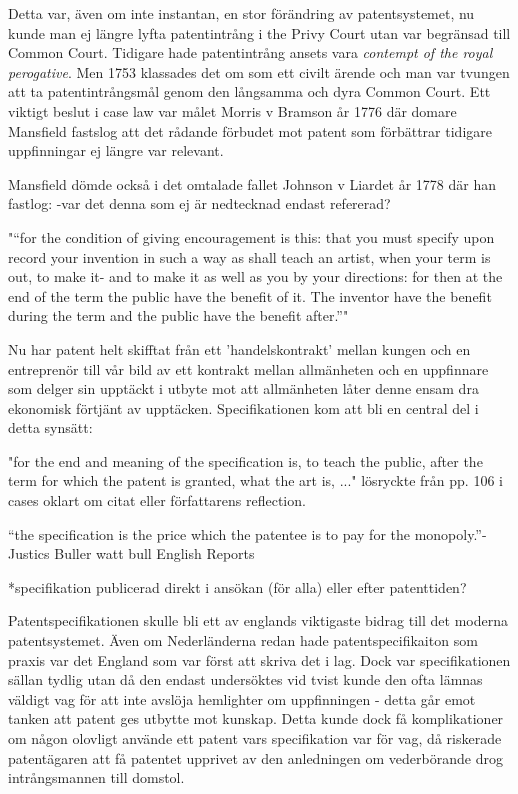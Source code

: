 Detta var, även om inte instantan, en stor förändring av patentsystemet, nu kunde man ej längre lyfta patentintrång i the Privy Court utan var begränsad till Common Court. Tidigare hade patentintrång ansets vara \emph{contempt of the royal perogative}. Men 1753 klassades det om som ett civilt ärende och man var tvungen att ta patentintrångsmål genom den långsamma och dyra Common Court. Ett viktigt beslut i case law var målet Morris v Bramson år 1776 där domare Mansfield fastslog att det rådande förbudet mot patent som förbättrar tidigare uppfinningar ej längre var relevant\cite{bracha}.

Mansfield dömde också i det omtalade fallet Johnson v Liardet år 1778 där han fastlog:
 -var det denna som ej är nedtecknad endast refererad?

"“for the condition of giving encouragement is this: that 
you must specify upon record your invention in such a 
way as shall teach an artist, when your term is out, to 
make it- and to make it as well as you by your directions: 
for then at the end of the term the public have the benefit 
of it. The inventor have the benefit during the term and 
the public have the benefit after.”" \cite{hulme1}

Nu har patent helt skifftat från ett 'handelskontrakt' mellan kungen och en entreprenör till vår bild av ett kontrakt mellan allmänheten och en uppfinnare som delger sin upptäckt i utbyte mot att allmänheten låter denne ensam dra ekonomisk förtjänt av upptäcken. Specifikationen kom att bli en central del i detta synsätt: 

"for the end and meaning of the specification is, to teach the public, after the term for which the patent is granted, what the art is, ..." \cite{cases-davies} lösryckte från pp. 106 i cases oklart om citat eller författarens reflection.


“the specification is the price which 
the patentee is to pay for the monopoly.”-Justics Buller watt bull \cite{2 H. Bl. 463, 472, 126 Eng. Rep. 651, 656 (C.P. 1795)} English Reports

*specifikation publicerad direkt i ansökan (för alla) eller efter patenttiden?

Patentspecifikationen skulle bli ett av englands viktigaste bidrag till det
moderna patentsystemet. Även om
Nederländerna redan hade patentspecifikaiton som praxis var det England som var först att skriva det i
lag. \cite{macleod} Dock var specifikationen sällan tydlig utan då den endast undersöktes vid tvist
kunde den ofta lämnas väldigt vag för att inte avslöja hemlighter om uppfinningen - detta går emot tanken
att patent ges utbytte mot kunskap. Detta kunde dock få komplikationer om någon olovligt använde ett
patent vars specifikation var för vag, då riskerade patentägaren att få patentet upprivet av den anledningen om vederbörande drog intrångsmannen till domstol.

